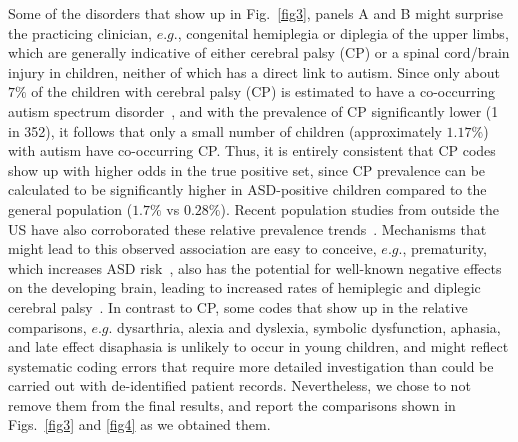\documentclass[onecolumn,,10pt]{IEEEtran}
\newcommand{\hil}[1]{{\color{Red1}\itshape #1}}
\begin{document}
Some of the disorders that show up in Fig.~\ref{fig3}, panels A and B might  surprise the practicing clinician, $e.g.$,  congenital hemiplegia or diplegia of the upper limbs, which are generally indicative of either  cerebral palsy (CP) or a spinal cord/brain injury in children, neither of which has a direct  link to autism. Since only about $7\%$ of the children with  cerebral palsy (CP) is estimated to have a  co-occurring autism spectrum disorder~\cite{cdccp,christensen2014prevalence}, and with the prevalence of CP  significantly lower (1 in 352), it follows that  only a small number of children (approximately $1.17\%$) with autism have co-occurring CP. Thus, it is entirely consistent that CP codes show  up with higher odds in the true positive set, since CP prevalence can be calculated to be significantly higher in ASD-positive children compared to the general population ($1.7\%$ vs $0.28\%$). Recent population studies from outside the US have also corroborated  these relative prevalence trends~\cite{paahlman2020autism}. Mechanisms that might lead to this observed association are easy to conceive, $e.g.$, prematurity, which increases ASD risk~\cite{cdc}, also has the potential for well-known negative effects on the developing brain, leading to increased rates of hemiplegic and diplegic cerebral palsy~\cite{sukhov2012risk}. In contrast to CP, some  codes that show up in the relative comparisons, $e.g.$  dysarthria, alexia and dyslexia, symbolic dysfunction, aphasia, and late effect disaphasia  is unlikely to occur in  young children, and might reflect systematic coding errors that require more detailed investigation than could be carried out with de-identified patient records. 
Nevertheless, we chose to not remove them from the final results, and
report the comparisons shown in  Figs.~\ref{fig3} and \ref{fig4} as we obtained them.


\end{document}
